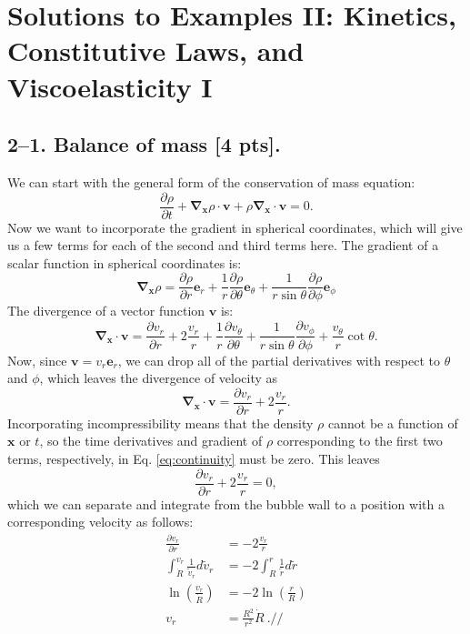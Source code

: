 \setcounter{section}{1} 
\section*{Solutions to Examples II: Kinetics, Constitutive Laws, and Viscoelasticity I}
\label{soln-PS2}

\medskip
\subsection*{2--1. \textbf{Balance of mass} [4 pts].} 
We can start with the general form of the conservation of mass equation:
\begin{equation}
\label{eq:continuity}
    \frac{\partial \rho}{\partial t} + \bm{\nabla}_{\bm{x}} \rho \cdot\bm{v} + \rho \bm{\nabla}_{\bm{x}} \cdot \bm{v} = 0.
\end{equation}
    Now we want to incorporate the gradient in spherical coordinates, which will give us a few terms for each of the second and third terms here. 
    The gradient of a scalar function in spherical coordinates is:
\begin{equation*}
    \bm{\nabla}_{\bm{x}} \rho = \frac{\partial \rho}{\partial r} \bm{e}_r + \frac{1}{r} \frac{\partial \rho}{\partial \theta} \bm{e}_\theta  + \frac{1}{r\sin\theta}\frac{\partial \rho}{\partial \phi} \bm{e}_\phi  
\end{equation*}
The divergence of a vector function $\bm{v}$ is:
\begin{equation*}
    \bm{\nabla}_{\bm{x}} \cdot \bm{v} = \frac{\partial v_r}{\partial r} + 2\frac{v_r}{r}+ \frac{1}{r}\frac{\partial v_\theta}{\partial \theta} + \frac{1}{r \sin\theta}\frac{\partial v_\phi}{\partial \phi} + \frac{v_\theta}{r}\cot\theta.
\end{equation*}
Now, since $\bm{v} = v_r \bm{e}_r$, we can drop all of the partial derivatives with respect to $\theta$ and $\phi$, which leaves the divergence of velocity as
\begin{equation*}
    \bm{\nabla}_{\bm{x}} \cdot \bm{v} = \frac{\partial v_r}{\partial r} + 2\frac{v_r}{r}.
\end{equation*}
Incorporating incompressibility means that the density $\rho$ cannot be a function of $\bm{x}$ or $t$, so the time derivatives and gradient of $\rho$ corresponding to the first two terms, respectively, in Eq. \ref{eq:continuity} must be zero. 
This leaves
\begin{equation*}
    \frac{\partial v_r}{\partial r} + 2\frac{v_r}{r} = 0,
\end{equation*}
which we can separate and integrate from the bubble wall to a position with a corresponding velocity as follows:
\begin{align*}
    \frac{\partial v_r}{\partial r} &= -2\frac{v_r}{r}\\
    \int_{\dot{R}}^{v_r} \frac{1}{\tilde{v}_r} d\tilde{v}_r &= -2\int_R^r \frac{1}{\tilde{r}} d\tilde{r}\\
    \ln\left(\frac{v_r}{\dot{R}}\right) &= -2 \ln\left(\frac{r}{R}\right)\\
    v_r &= \frac{R^2}{r^2}\dot{R} ~.//
\end{align*}


